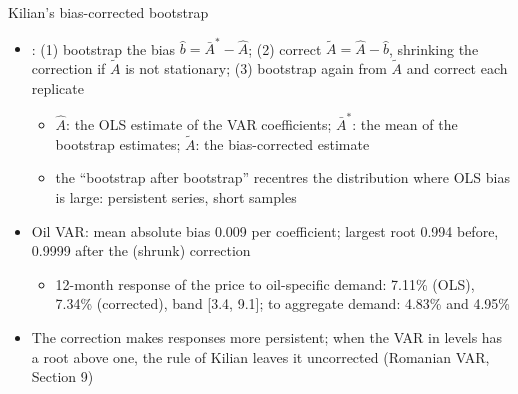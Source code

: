 \begin{frame}{Kilian's bias-corrected bootstrap}
\itemsize{\small}
\begin{itemize}
    \item {}: (1) bootstrap the bias $\hat b = \bar A^* - \hat A$; (2) correct $\tilde A = \hat A - \hat b$, shrinking the correction if $\tilde A$ is not stationary; (3) bootstrap again from $\tilde A$ and correct each replicate
    \begin{itemize}
        \item $\hat A$: the OLS estimate of the VAR coefficients; $\bar A^*$: the mean of the bootstrap estimates; $\tilde A$: the bias-corrected estimate
        \item the ``bootstrap after bootstrap'' recentres the distribution where OLS bias is large: persistent series, short samples
    \end{itemize}
    \item Oil VAR: mean absolute bias 0.009 per coefficient; largest root 0.994 before, 0.9999 after the (shrunk) correction
    \begin{itemize}
        \item 12-month response of the price to oil-specific demand: 7.11\% (OLS), 7.34\% (corrected), band [3.4, 9.1]; to aggregate demand: 4.83\% and 4.95\%
    \end{itemize}
    \item The correction makes responses more persistent; when the VAR in levels has a root above one, the rule of Kilian leaves it uncorrected (Romanian VAR, Section 9)
\end{itemize}
\end{frame}

